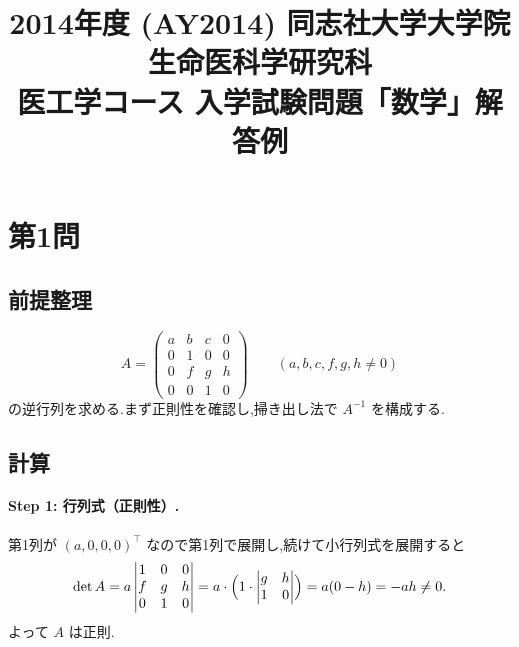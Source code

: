 \documentclass[11pt,a4paper]{article}
\title{2014年度 (AY2014) 同志社大学大学院 生命医科学研究科\\
医工学コース 入学試験問題「数学」解答例}
\author{}
\date{}
\begin{document}
\maketitle
\vspace{-3em}

\section*{第1問}

\subsection*{前提整理}

\[
A=\begin{pmatrix}a&b&c&0\\0&1&0&0\\0&f&g&h\\0&0&1&0\end{pmatrix}
\qquad(a,b,c,f,g,h\neq0)
\]
の逆行列を求める.まず正則性を確認し,掃き出し法で $A^{-1}$ を構成する.

\subsection*{計算}

\paragraph{Step 1: 行列式（正則性）.}
第1列が $(a,0,0,0)^\top$ なので第1列で展開し,続けて小行列式を展開すると
\[
\det A=a\begin{vmatrix}1&0&0\\f&g&h\\0&1&0\end{vmatrix}
=a\cdot\Bigl(1\cdot\begin{vmatrix}g&h\\1&0\end{vmatrix}\Bigr)
=a(0-h)=-ah\neq0.
\]
よって $A$ は正則.
\end{document}
